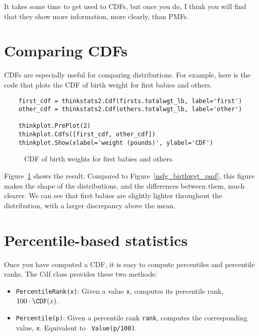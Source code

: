 It takes some time to get used to CDFs, but once you
do, I think you will find that they show more information, more
clearly, than PMFs.


\section{Comparing CDFs}
\label{birth_weights}

CDFs are especially useful for comparing distributions.  For
example, here is the code that plots the CDF of birth
weight for first babies and others.

\begin{verbatim}
    first_cdf = thinkstats2.Cdf(firsts.totalwgt_lb, label='first')
    other_cdf = thinkstats2.Cdf(others.totalwgt_lb, label='other')

    thinkplot.PrePlot(2)
    thinkplot.Cdfs([first_cdf, other_cdf])
    thinkplot.Show(xlabel='weight (pounds)', ylabel='CDF')
\end{verbatim}

\begin{figure}
\caption{CDF of birth weights for first babies and others.}
\label{cumulative_birthwgt_cdf}
\end{figure}

Figure~\ref{cumulative_birthwgt_cdf} shows the result.
Compared to Figure~\ref{nsfg_birthwgt_pmf},
this figure makes the shape of the distributions, and the differences
between them, much clearer.  We can see that first babies are slightly
lighter throughout the distribution, with a larger discrepancy above 
the mean.




\section{Percentile-based statistics}

Once you have computed a CDF, it is easy to compute percentiles
and percentile ranks.  The Cdf class provides these two methods:

\begin{itemize}

\item {\tt PercentileRank(x)}: Given a value {\tt x}, computes its
  percentile rank, $100 \cdot \CDF(x)$.

\item {\tt Percentile(p)}: Given a percentile rank {\tt rank},
  computes the corresponding value, {\tt x}.  Equivalent to {\tt
    Value(p/100)}.

\end{itemize}

